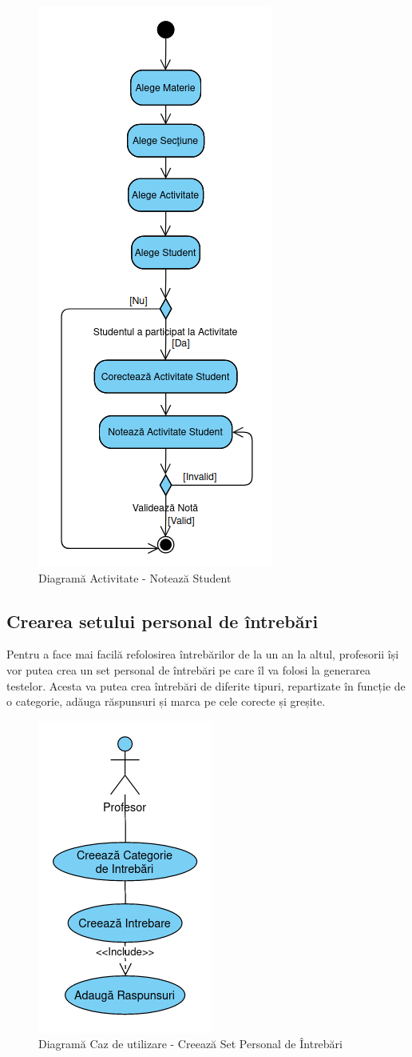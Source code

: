 \documentclass[12pt, a4paper, oneside, romanian]{teza-upb}
\begin{document}
\begin{figure}[H]
\centering
\includegraphics*[width=0.4\columnwidth]{diagrama-activitate-noteaza-student}
\caption{Diagramă Activitate - Notează Student}
\label{diagrama-activitate-noteaza-student}
\end{figure}

\subsection{Crearea setului personal de întrebări}

Pentru a face mai facilă refolosirea întrebărilor de la un an la altul, profesorii își vor putea crea un set personal de întrebări pe care îl va folosi la generarea testelor. Acesta va putea crea întrebări de diferite tipuri, repartizate în funcție de o categorie, adăuga răspunsuri și marca pe cele corecte și greșite.

\begin{figure}[H]
\centering
\includegraphics*[width=0.3\columnwidth]{diagrama-use-case-creeaza-set-personal-de-intrebari}
\caption{Diagramă Caz de utilizare - Creează Set Personal de Întrebări}
\label{diagrama-use-case-creeaza-set-personal-de-intrebari}
\end{figure}
\end{document}
